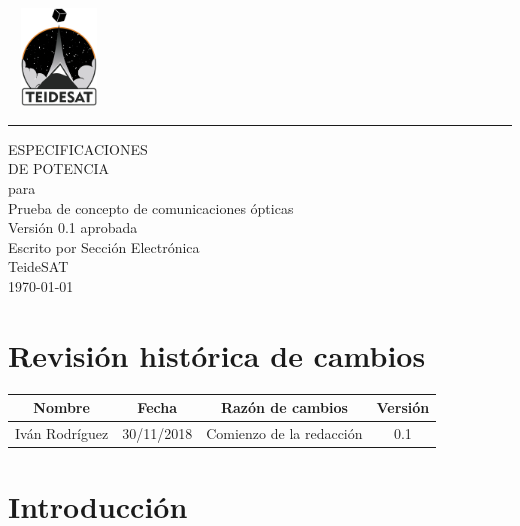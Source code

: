\documentclass{scrreprt}
\date{}
\def\myversion{0.1 }
\begin{document}
 \hfill\includegraphics[width=2.7cm,height=2.6cm]{Logo.png}\\[\bigskipamount]\vspace*{-1.5cm}
\begin{flushright}
    \rule{15cm}{3pt}\vskip0.8cm
    \begin{bfseries}
        \Huge{ESPECIFICACIONES \\ DE POTENCIA}\\
        \vspace{1cm}
        para\\
        \vspace{1cm}
        Prueba de concepto de comunicaciones ópticas\\
        \vspace{2.5cm}
        \LARGE{Versión \myversion aprobada}\\
        \vspace{3cm}
        \large{Escrito por  Sección Electrónica} \\
        \vspace{0.5cm}
        TeideSAT\\
        \vspace{1.5cm}
        \today\\
    \end{bfseries}
\end{flushright}

\tableofcontents


\chapter*{Revisión histórica de cambios}

\begin{center}
    \begin{tabular}{|c|c|c|c|}
        \hline
	    Nombre & Fecha & Razón de cambios & Versión\\
        \hline
	    Iván Rodríguez & 30/11/2018 & Comienzo de la redacción & 0.1\\
        \hline
    \end{tabular}
\end{center}

\chapter{Introducción}
\end{document}
